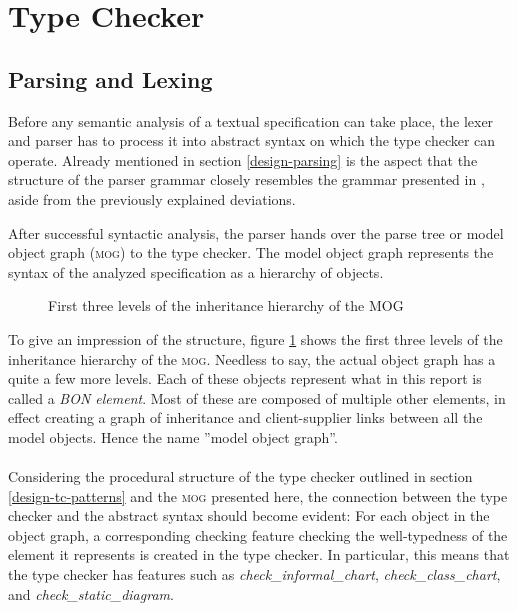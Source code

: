 \section{Type Checker}
\subsection{Parsing and Lexing}
Before any semantic analysis of a textual \bon{} specification can take place, the lexer and parser has to process it into abstract syntax on which the type checker can operate. Already mentioned in section \ref{design-parsing} is the aspect that the structure of the parser grammar closely resembles the grammar presented in \cite[pp.~352-359]{walden1995}, aside from the previously explained deviations.

After successful syntactic analysis, the parser hands over the parse tree or model object graph (\textsc{mog}) to the type checker. The model object graph represents the syntax of the analyzed specification as a hierarchy of objects.
\begin{figure}[H]
    \centerline{}
    \caption[MOG hierarchy]{First three levels of the inheritance hierarchy of the MOG}
    \label{fig:mog-hierarchy}
\end{figure}
To give an impression of the structure, figure \ref{fig:mog-hierarchy} shows the first three levels of the inheritance hierarchy of the \textsc{mog}. Needless to say, the actual object graph has a quite a few more levels. Each of these objects represent what in this report is called a \textit{BON element}. Most of these are composed of multiple other \bon{} elements, in effect creating a graph of inheritance and client-supplier links between all the model objects. Hence the name ''model object graph''.
\paragraph{}
Considering the procedural structure of the type checker outlined in section \ref{design-tc-patterns} and the \textsc{mog} presented here, the connection between the type checker and the abstract syntax should become evident: For each object in the object graph, a corresponding checking feature checking the well-typedness of the \bon{} element it represents is created in the type checker. In particular, this means that the type checker has features such as \textit{check\_informal\_chart}, \textit{check\_class\_chart}, and \textit{check\_static\_diagram}.

